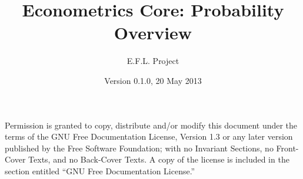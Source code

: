 \documentclass[nofonts]{tufte-latex/tufte-handout}
\title{Econometrics Core: Probability Overview}
\author{E.F.L. Project}
\date{Version 0.1.0, 20 May 2013}
\begin{document}
\maketitle
\tableofcontents

  Permission is granted to
copy, distribute and/or modify this document under the terms of the
GNU Free Documentation License, Version 1.3 or any later version
published by the Free Software Foundation; with no Invariant Sections,
no Front-Cover Texts, and no Back-Cover Texts.  A copy of the license
is included in the section entitled ``GNU Free Documentation
License.''






\appendix

\end{document}
